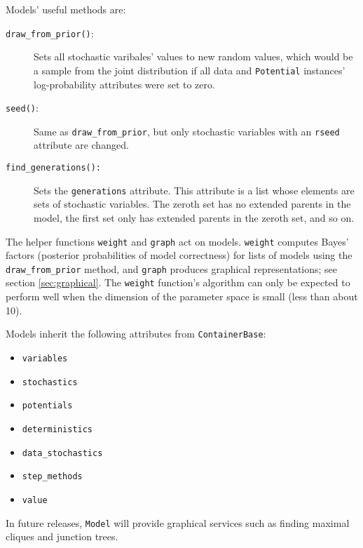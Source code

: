 Models' useful methods are:
\begin{description}
    \item[\texttt{draw_from_prior()}:] Sets all stochastic varibales' values to new random values, which would be a sample from the joint distribution if all data and \texttt{Potential} instances' log-probability attributes were set to zero.
    \item[\texttt{seed()}:] Same as \texttt{draw_from_prior}, but only stochastic variables with an \texttt{rseed} attribute are changed.
    \item[\texttt{find_generations():}] Sets the \texttt{generations} attribute. This attribute is a list whose elements are sets of stochastic variables. The zeroth set has no extended parents in the model, the first set only has extended parents in the zeroth set, and so on.
\end{description}

The helper functions \texttt{weight} and \texttt{graph} act on models. \texttt{weight} computes Bayes' factors (posterior probabilities of model correctness) for lists of models using the \texttt{draw_from_prior} method, and \texttt{graph} produces graphical representations; see section \ref{sec:graphical}. The \texttt{weight} function's algorithm can only be expected to perform well when the dimension of the parameter space is small (less than about 10).

Models inherit the following attributes from \texttt{ContainerBase}:
\begin{itemize}
    \item \texttt{variables}
    \item \texttt{stochastics}
    \item \texttt{potentials}
    \item \texttt{deterministics}
    \item \texttt{data_stochastics}
    \item \texttt{step_methods}
    \item \texttt{value}
\end{itemize}


In future releases, \texttt{Model} will provide graphical services such as finding maximal cliques and junction trees.


